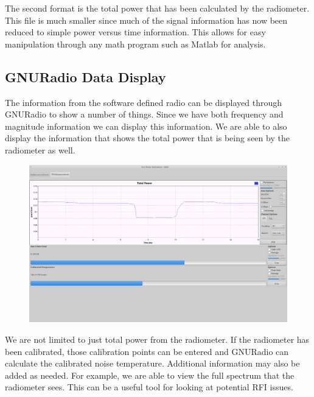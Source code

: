 The second format is the total power that has been calculated by the radiometer.  This file is much smaller since much of the signal information has now been reduced to simple power versus time information.  This allows for easy manipulation through any math program such as Matlab for analysis.  

\subsection{GNURadio Data Display}
The information from the software defined radio can be displayed through GNURadio to show a number of things.  Since we have both frequency and magnitude information we can display this information.  We are able to also display the information that shows the total power that is being seen by the radiometer as well.

{\begin{figure}[h!tb] 
\centering
\includegraphics[width=17cm]{Images/Lab1_TPR_at_end_exp.png}
\label{radiometer_tpr_display}
\end{figure}
}

We are not limited to just total power from the radiometer.  If the radiometer has been calibrated, those calibration points can be entered and GNURadio can calculate the calibrated noise temperature.  Additional information may also be added as needed.  For example, we are able to view the full spectrum that the radiometer sees.  This can be a useful tool for looking at potential RFI issues.  




